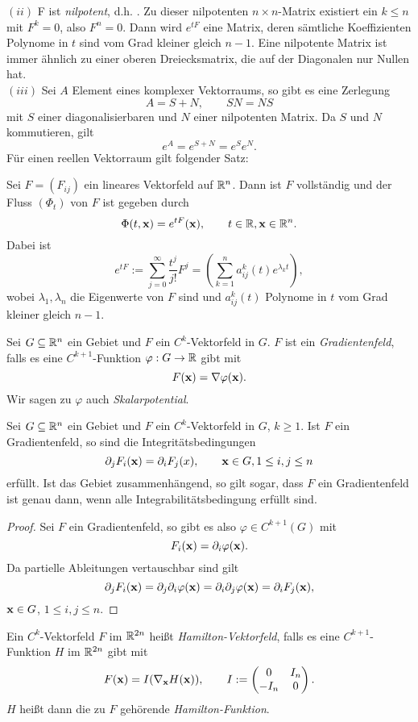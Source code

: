 \documentclass[
pdftex,
oneside,
headsepline,
11pt, 
]{scrreprt}
\begin{document}
$(ii)$ F ist \textit{nilpotent}, d.h. . 
Zu dieser nilpotenten $n \times n$-Matrix existiert ein $k \leq n$ mit $F^k = 0$, also $F^n = 0$. 
Dann wird $e^{tF}$ eine Matrix, deren sämtliche Koeffizienten Polynome in $t$ sind vom Grad kleiner gleich $n-1$. Eine nilpotente Matrix ist immer ähnlich zu einer oberen Dreiecksmatrix, die auf der Diagonalen nur Nullen hat.\\
$(iii)$ Sei $A$ Element eines komplexer Vektorraums, so gibt es eine Zerlegung \[A=S+N,\qquad SN=NS\] mit $S$ einer diagonalisierbaren und $N$ einer nilpotenten Matrix. Da $S$ und $N$ kommutieren, gilt \[ e^A=e^{S+N}=e^Se^N.\] Für einen reellen Vektorraum gilt folgender Satz:
\begin{theo}[Normalformensatz]
	Sei $F=(F_{ij})$ ein lineares Vektorfeld auf $\mathbb{R}^n$. Dann ist $F$ vollständig und der Fluss $(\Phi_t)$ von $F$ ist gegeben durch \[\Phi(t,\textnormal{\textbf{x}})=e^{tF}(\textnormal{\textbf{x}}),\qquad t\in \mathbb{R},\textnormal{\textbf{x}}\in \mathbb{R}^n.\] Dabei ist \[e^{tF}:=\sum_{j=0}^\infty\frac{t^j}{j!}F^j=\left(  \sum_{k=1}^n a_{ij}^k(t) e^{\lambda_k t} \right),\]
	wobei $\lambda_1,\lambda_n$ die Eigenwerte von $F$ sind und $a_{ij}^k(t)$ Polynome in $t$ vom Grad kleiner gleich $n-1$.
\end{theo}
\begin{de}[Gradientenfeld]
	Sei $G\subseteq \mathbb{R}^n$ ein Gebiet und $F$ ein $C^k$-Vektorfeld in $G$. $F$ ist ein \textit{Gradientenfeld}, falls es eine $C^{k+1}$-Funktion $\varphi:G\to \mathbb{R}$ gibt mit \[F(\textnormal{\textbf{x}})=\nabla \varphi(\textnormal{\textbf{x}}).\] Wir sagen zu $\varphi$ auch \textit{Skalarpotential}.
\end{de}
\begin{lem}[Integrabilitätsbedingungen]
	Sei $G\subseteq \mathbb{R}^n$ ein Gebiet und $F$ ein $C^k$-Vektorfeld in $G$, $k\geq 1$.  Ist $F$ ein Gradientenfeld, so sind die  Integritätsbedingungen
	 \[  \partial_j F_i(\textnormal{\textbf{x}})=\partial_i F_j(x),\qquad \textnormal{\textbf{x}}\in G, 1\leq i,j\leq n \] 
	 erfüllt. Ist das Gebiet zusammenhängend, so gilt sogar, dass $F$ ein Gradientenfeld ist genau dann, wenn alle Integrabilitätsbedingung erfüllt sind.
\end{lem}
\begin{proof}
	Sei $F$ ein Gradientenfeld, so gibt es also $\varphi\in C^{k+1}(G)$ mit \[  F_i(\textnormal{\textbf{x}})=\partial_i \varphi(\textnormal{\textbf{x}}). \] Da partielle Ableitungen vertauschbar sind gilt \[ \partial_j F_i(\textnormal{\textbf{x}})=\partial_j\partial_i\varphi(\textnormal{\textbf{x}})=\partial_i\partial_j\varphi(\textnormal{\textbf{x}})=\partial_i F_j(\textnormal{\textbf{x}}), \]
	$\textnormal{\textbf{x}} \in G$, $1\leq i,j\leq n.$
\end{proof}
\begin{de}
	Ein $C^k$-Vektorfeld $F$ im $\mathbb{R}^{2n}$ heißt \textit{Hamilton-Vektorfeld}, falls es eine $C^{k+1}$-Funktion $H$ im $\mathbb{R}^{2n}$ gibt mit \[ F(\textnormal{\textbf{x}})=I(\nabla_{\textnormal{\textbf{x}}}H(\textnormal{\textbf{x}})),\qquad I:=\begin{pmatrix}
	0 & I_n\\
	-I_n & 0
	\end{pmatrix}. \] $H$ heißt dann die zu $F$ gehörende \textit{Hamilton-Funktion}. 
\end{de}
\begin{bsp}
	
\end{bsp}
\end{document}
